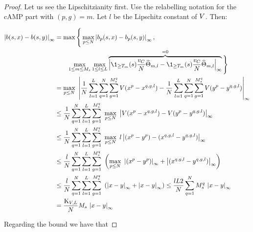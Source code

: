 \begin{proof}
	Let us see the Lipschitzianity first. Use the relabelling notation for the cAMP part with $(p,g) = m$. Let $l$ be the Lipschitz constant of $V$. Then:
	
	\begin{align*}
		\normp{\infty}{\drift(s,x) - \drift(s,y)} 
		&= \max \Bigg\{
		\max_{p\leq N}
		\norm{\drift_p(s,x) - \drift_p(s,y)}_\infty,
		\\
		&\qquad
		\max_{1 \leq m \leq \hmactive_s}
		\max_{1 \leq l \leq \NumCampRelease}
		\overbrace{
			\norm{\1_{\geq \btime_m}(s)  \frac{\cdrift}{N}  \cgonia_{m,l} - \1_{\geq \btime_m}(s)  \frac{\cdrift}{N}  \cgonia_{m,l}}_\infty
		}^{=0}
		\Bigg\}
		\\
		&= \max_{p\leq N}\
		\norm{\frac{1}{N} \sum _{l = 1}^{\NumCampRelease} \sum _{q = 1}^{N} \sum_{g = 1}^{\hmactive_s^q} \attraction(x^p - x^{q,g,l}) - \frac{1}{N} \sum _{l = 1}^{\NumCampRelease} \sum _{q = 1}^{N} \sum_{g = 1}^{\hmactive_s^q} \attraction(y^p - y^{q,g,l})}_\infty
		\\
		& \leq
		\frac{1}{N}
		\sum _{q = 1}^{N}
		\sum _{l = 1}^{\NumCampRelease}
		\sum_{g = 1}^{\hmactive_s^q}\
		\max_{p\leq N}\
		\norm{\attraction(x^p - x^{q,g,l}) - \attraction(y^p - y^{q,g,l})}_\infty
		\\
		& \leq
		\frac{1}{N}
		\sum _{q = 1}^{N}
		\sum _{l = 1}^{\NumCampRelease}
		\sum_{g = 1}^{\hmactive_s^q}\
		\max_{p\leq N}\
		l
		\norm{(x^p - y^p) - ( x^{q,g,l}- y^{q,g,l})}_\infty
		\\
		&\leq
		\frac{l}{N}
		\sum _{q = 1}^{N}
		\sum _{l = 1}^{\NumCampRelease}
		\sum_{g = 1}^{\hmactive_s^q}\
		\left(
		\max_{p\leq N}\
		\norm{(x^p - y^p)}_\infty + \norm{ ( x^{q,g,l}- y^{q,g,l})}_\infty
		\right)
		\\
		&\leq
		\frac{l}{N}
		\sum _{q = 1}^{N}
		\sum _{l = 1}^{\NumCampRelease}
		\sum_{g = 1}^{\hmactive_s^q}\
		\left(
		\normp{\infty}{x - y} + \normp{\infty}{x - y} 
		\right)
		\leq
		\frac{l\NumCampRelease2}{N}
		\sum _{q = 1}^{N}
		\hmactive_s^q\
		\normp{\infty}{x - y}
		\\
		&=
		\frac{\const_{\attraction,\NumCampRelease}}{N}
		\hmactive_s\
		\normp{\infty}{x - y}
	\end{align*}
	
	Regarding the bound we have that
	

\end{proof}
